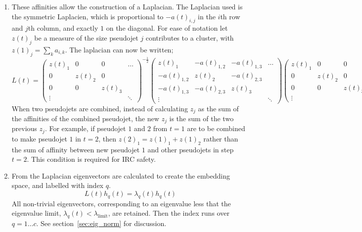 \begin{enumerate}
\item\label{step:laplacean} These affinities allow the construction of a Laplacian.
    The Laplacian used is the symmetric Laplacien, which is proportional to \(-a(t)_{i, j}\)
        in the \(i\)th row and \(j\)th column, and exactly \(1\) on the diagonal.
        For ease of notation let \(z(t)_j\) be a measure of the size pseudojet \(j\) contributes to a cluster,
        with \(z(1)_j = \sum_k a_{i,k}\).
        The laplacian can now be written;
    \begin{equation}\label{eqn:laplacian}
        L(t) = 
        \begin{pmatrix}
            z(t)_1      & 0   & 0  & \hdots \\
            0     & z(t)_2 &    0     & \\
            0     &    0     & z(t)_3 & \\
            \vdots   &          &     & \ddots 
        \end{pmatrix}^{-\frac{1}{2}}
        \begin{pmatrix}
            z(t)_1 & -a(t)_{1,2} & -a(t)_{1,3} & \hdots \\
            -a(t)_{1,2} & z(t)_2 & -a(t)_{2,3} & \\
            -a(t)_{1,3} & -a(t)_{2,3} & z(t)_3 & \\
            \vdots   &          &     & \ddots 
        \end{pmatrix}
        \begin{pmatrix}
            z(t)_1      & 0   & 0  & \hdots \\
            0     & z(t)_2 &    0     & \\
            0     &    0     & z(t)_3 & \\
            \vdots   &          &     & \ddots 
        \end{pmatrix}^{-\frac{1}{2}}.
    \end{equation}
        When two pseudojets are combined, instead of calculating \(z_j\) as the sum of the affinities of the combined pseudojet,
        the new \(z_j\) is the sum of the two previous \(z_j\).
        For example, if pseudojet \(1\) and \(2\) from \(t=1\) are to be combined to make pseudojet \(1\) in \(t=2\),
        then \(z(2)_{1} = z(1)_1 + z(1)_2\) rather than the sum of affinity between new pseudojet \(1\) and other pseudojets in step \(t=2\).
        This condition is required for IRC safety.  %

    \item \label{step:eigenvectors} From the Laplacian eigenvectors are calculated to create the embedding space, and labelled with index \(q\).
            \begin{equation}
                L(t)h_q(t) = \lambda_q(t) h_q(t)
            \end{equation}
            All non-trivial eigenvectors, corresponding
            to an eigenvalue less that the eigenvalue limit, \(\lambda_q(t) < \lambda_\text{limit}\),
            are retained.
            Then the index runs over \(q = 1 \dots c\).
            See section~\ref{sec:eig_norm} for discussion.


\end{enumerate}
